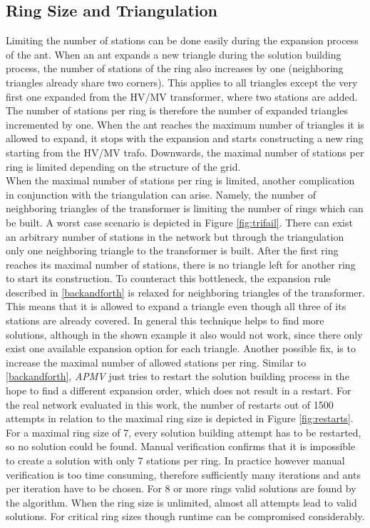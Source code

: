 \subsection{Ring Size and Triangulation}\label{sec:tri_problem}
Limiting the number of stations can be done easily during the expansion process of the ant. When an ant expands a new triangle during the solution building process, the number of stations of the ring also increases by one (neighboring triangles already share two corners). This applies to all triangles except the very first one expanded from the HV/MV transformer, where two stations are added. The number of stations per ring is therefore the number of expanded triangles incremented by one. When the ant reaches the maximum number of triangles it is allowed to expand, it stops with the expansion and starts constructing a new ring starting from the HV/MV trafo. Downwards, the maximal number of stations per ring is limited depending on the structure of the grid. \\
When the maximal number of stations per ring is limited, another complication in conjunction with the triangulation can arise. Namely, the number of neighboring triangles of the transformer is limiting the number of rings which can be built.
A worst case scenario is depicted in Figure \ref{fig:trifail}. There can exist an arbitrary number of stations in the network but through the triangulation only one neighboring triangle to the transformer is built. After the first ring reaches its maximal number of stations, there is no triangle left for another ring to start its construction. To counteract this bottleneck, the expansion rule described in \ref{backandforth} is relaxed for neighboring triangles of the transformer. This means that it is allowed to expand a triangle even though all three of its stations are already covered. In general this technique helps to find more solutions, although in the shown example it also would not work, since there only exist one available expansion option for each triangle. Another possible fix, is to increase the maximal number of allowed stations per ring. Similar to \ref{backandforth}, \textit{APMV} just tries to restart the solution building process in the hope to find a different expansion order, which does not result in a restart. For the real network evaluated in this work, the number of restarts out of 1500 attempts in relation to the maximal ring size is depicted in Figure \ref{fig:restarts}. For a maximal ring size of 7, every solution building attempt has to be restarted, so no solution could be found. Manual verification confirms that it is impossible to create a solution with only 7 stations per ring. In practice however manual verification is too time consuming, therefore sufficiently many iterations and ants per iteration have to be chosen. For 8 or more rings valid solutions are found by the algorithm. When the ring size is unlimited, almost all attempts lead to valid solutions. For critical ring sizes though runtime can be compromised considerably.


